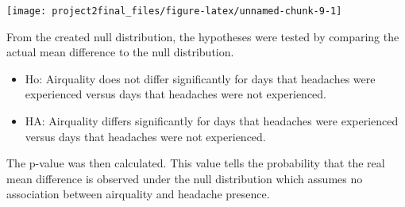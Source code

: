 \documentclass[]{article}
\newenvironment{Shaded}{\begin{snugshade}}{\end{snugshade}}
\newcommand{\ControlFlowTok}[1]{\textcolor[rgb]{0.13,0.29,0.53}{\textbf{#1}}}
\newcommand{\DataTypeTok}[1]{\textcolor[rgb]{0.13,0.29,0.53}{#1}}
\newcommand{\DecValTok}[1]{\textcolor[rgb]{0.00,0.00,0.81}{#1}}
\newcommand{\FloatTok}[1]{\textcolor[rgb]{0.00,0.00,0.81}{#1}}
\newcommand{\KeywordTok}[1]{\textcolor[rgb]{0.13,0.29,0.53}{\textbf{#1}}}
\newcommand{\NormalTok}[1]{#1}
\newcommand{\OperatorTok}[1]{\textcolor[rgb]{0.81,0.36,0.00}{\textbf{#1}}}
\newcommand{\StringTok}[1]{\textcolor[rgb]{0.31,0.60,0.02}{#1}}
\begin{document}
\begin{Shaded}
\end{Shaded}

\begin{center}\texttt{[image: project2final\_files/figure-latex/unnamed-chunk-9-1]} \end{center}

From the created null distribution, the hypotheses were tested by
comparing the actual mean difference to the null distribution.

\begin{itemize}
\item
  Ho: Airquality does not differ significantly for days that headaches
  were experienced versus days that headaches were not experienced.
\item
  HA: Airquality differs significantly for days that headaches were
  experienced versus days that headaches were not experienced.
\end{itemize}

The p-value was then calculated. This value tells the probability that
the real mean difference is observed under the null distribution which
assumes no association between airquality and headache presence.
\end{document}
